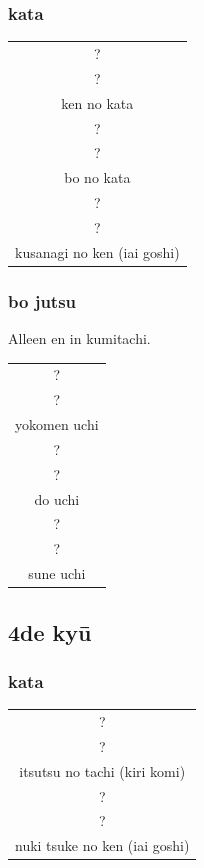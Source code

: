 \documentclass[12pt]{scrartcl}
\begin{document}
\begin{CJK*}{UTF8}{min}
\subsubsection{kata}
\begin{table}[H]
\begin{center}
\begin{tabular}{c}
?\\
?\\
ken no kata\\
\hline
?\\
?\\
bo no kata\\
\hline
?\\
?\\
kusanagi no ken (iai goshi)
\end{tabular}
\end{center}
\label{kyuu_5_katori_kata}
\end{table}

\subsubsection{bo jutsu}
\noindent Alleen en in kumitachi.
\begin{table}[H]
\begin{center}
\begin{tabular}{c}
?\\
?\\
yokomen uchi\\
\hline
?\\
?\\
do uchi\\
\hline
?\\
?\\
sune uchi
\end{tabular}
\end{center}
\label{kyuu_5_katori_bo}
\end{table}

\subsection{4de ky\={u}}
\subsubsection{kata}
\begin{table}[H]
\begin{center}
\begin{tabular}{c}
?\\
?\\
itsutsu no tachi (kiri komi)\\
\hline
?\\
?\\
nuki tsuke no ken (iai goshi)
\end{tabular}
\end{center}
\label{kyuu_4_katori_kata}
\end{table}


\end{CJK*}
\end{document}
